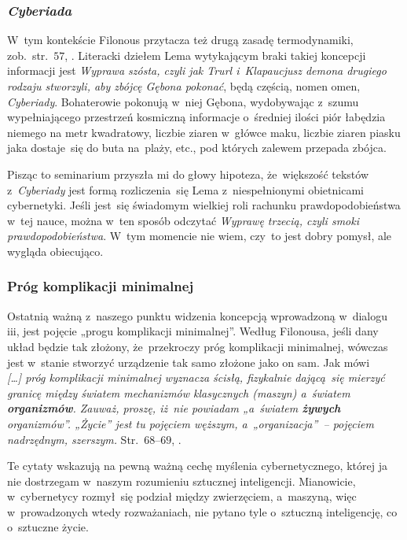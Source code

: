 \documentclass[10pt,t]{beamer}
\begin{document}
\begin{frame}
  \frametitle{\textit{Cyberiada}}


  W~tym kontekście Filonous przytacza też drugą zasadę termodynamiki,
  zob.~str.~$57$, \parencite{Lem-Dialogi-Vol-I-Pub-1996}. Literacki
  dziełem Lema wytykającym braki takiej koncepcji informacji jest
  \textit{Wyprawa szósta, czyli jak Trurl i~Klapaucjusz demona drugiego
    rodzaju stworzyli, aby zbójcę Gębona pokonać}, będą częścią,
  nomen omen, \textit{Cyberiady}. Bohaterowie pokonują w~niej Gębona,
  wydobywając z~szumu wypełniającego przestrzeń kosmiczną informacje
  o~średniej ilości piór łabędzia niemego na metr kwadratowy, liczbie
  ziaren w~główce maku, liczbie ziaren piasku jaka dostaje~się do buta
  na~plaży, etc., pod których zalewem przepada zbójca.


  Pisząc to seminarium przyszła mi do głowy hipoteza, że~większość tekstów
  z~\textit{Cyberiady} jest formą rozliczenia~się Lema z~niespełnionymi
  obietnicami cybernetyki. Jeśli jest~się świadomym wielkiej roli
  rachunku prawdopodobieństwa w~tej nauce, można w~ten sposób odczytać
  \textit{Wyprawę trzecią, czyli smoki prawdopodobieństwa}. W~tym momencie
  nie wiem, czy~to jest dobry pomysł, ale wygląda obiecująco.

\end{frame}





\begin{frame}
  \frametitle{Próg komplikacji minimalnej}


  Ostatnią ważną z~naszego punktu widzenia koncepcją wprowadzoną w~dialogu
  iii, jest pojęcie „progu komplikacji minimalnej”. Według Filonousa, jeśli
  dany układ będzie tak złożony, że~przekroczy próg komplikacji minimalnej,
  wówczas jest w~stanie stworzyć urządzenie tak samo złożone jako on sam.
  Jak mówi \\
  \textit{[\ldots] próg komplikacji minimalnej wyznacza ścisłą, fizykalnie
    dającą~się mierzyć granicę między światem mechanizmów klasycznych
    (maszyn) a~światem \textbf{organizmów}. Zauważ, proszę, iż~nie powiadam
    „a~światem \textbf{żywych} organizmów”. „Życie” jest tu pojęciem
    węższym, a~„organizacja”~-- pojęciem nadrzędnym, szerszym.}
  Str.~$68\text{--}69$, \parencite{Lem-Dialogi-Vol-I-Pub-1996}.

  Te cytaty wskazują na pewną ważną cechę myślenia cybernetycznego, której
  ja nie dostrzegam w~naszym rozumieniu sztucznej inteligencji. Mianowicie,
  w~cybernetycy rozmył~się podział między zwierzęciem, a~maszyną, więc
  w~prowadzonych wtedy rozważaniach, nie pytano tyle o~sztuczną
  inteligencję, co o~\alert{sztuczne życie}.

\end{frame}
\end{document}
